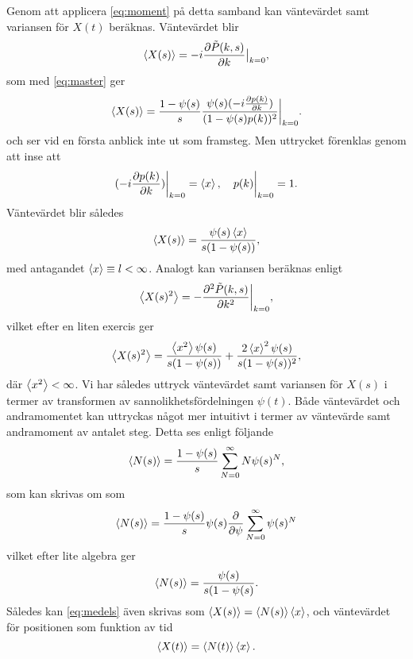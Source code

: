 Genom att applicera \eqref{eq:moment} på detta samband kan väntevärdet samt variansen för $X(t)$ beräknas. Väntevärdet blir 
\begin{equation}
\ev{X(s)} = -i\frac{\pd \tilde{P}(k,s)}{\pd k}\big |_{k=0},
\end{equation}
som med \eqref{eq:master} ger 
\begin{equation}
\ev{X(s)} = \frac{1-\psi(s)}{s}\frac{\psi(s)(-i\frac{\pd p(k)}{\pd k})}{(1-\psi(s)p(k))^2}\bigg |_{k=0}.
\end{equation}
och ser vid en första anblick inte ut som framsteg. Men uttrycket förenklas genom att inse att 
\begin{equation}
(-i\frac{\pd p(k)}{\pd k})\bigg |_{k=0} = \ev{x}, \quad p(k)\bigg |_{k=0} = 1. 
\end{equation}
Väntevärdet blir således 
\begin{equation}\label{eq:medels}
\ev{X(s)} = \frac{\psi(s)\ev{x}}{s(1-\psi(s))},
\end{equation}
med antagandet $\ev{x}\equiv l< \infty$. Analogt kan variansen beräknas enligt 
\begin{equation}
\ev{X(s)^2} = -\frac{\pd^2 \tilde{P}(k,s)}{\pd k^2}\bigg |_{k=0},
\end{equation}
vilket efter en liten exercis ger 
\begin{equation}\label{eq:vars}
\ev{X(s)^2} = \frac{\ev{x^2}\psi(s)}{s(1-\psi(s))}+\frac{2\ev{x}^2\psi(s)}{s(1-\psi(s))^2},
\end{equation}
där $\ev{x^2}< \infty$. Vi har således uttryck väntevärdet samt variansen för $X(s)$ i termer av transformen av sannolikhetsfördelningen $\psi(t)$. Både väntevärdet och andramomentet kan uttryckas något mer intuitivt i termer av väntevärde samt andramoment av antalet steg. Detta ses enligt följande 
\begin{equation}
   \ev{N(s)} = \frac{1-\psi(s)}{s}\sum_{N=0}^{\infty}N\psi (s)^N,
\end{equation}
som kan skrivas om som 
\begin{equation}
   \ev{N(s)} = \frac{1-\psi(s)}{s}\psi (s)\frac{\pd}{\pd \psi}\sum_{N=0}^{\infty}\psi (s)^N
\end{equation}
vilket efter lite algebra ger 
\begin{equation}
   \ev{N(s)} = \frac{\psi (s)}{s(1-\psi(s)}.
\end{equation}
Således kan \eqref{eq:medels} även skrivas som $\ev{X(s)}=\ev{N(s)}\ev{x}$, och väntevärdet för positionen som funktion av tid 
\begin{equation}
   \ev{X(t)} = \ev{N(t)}\ev{x}.
\end{equation}

